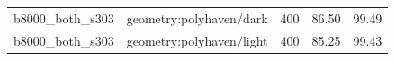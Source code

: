 \begin{longtable}{l>{\raggedright\arraybackslash}p{.42\linewidth}rrr}
b8000\_\allowbreak{}both\_\allowbreak{}s303 & %
geometry:polyhaven/dark & %
400 & %
86.50 & %
99.49 \\ %

b8000\_\allowbreak{}both\_\allowbreak{}s303 & %
geometry:polyhaven/light & %
400 & %
85.25 & %
99.43 \\ %


\end{longtable}
